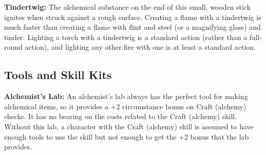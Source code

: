\textbf{Tindertwig:} The alchemical substance on the end of this small, wooden 
stick ignites when struck against a rough surface. Creating a flame with a tindertwig 
is much faster than creating a flame with flint and steel (or a magnifying glass) 
and tinder. Lighting a torch with a tindertwig is a standard action (rather than 
a full-round action), and lighting any other fire with one is at least a standard 
action.

\subsection{Tools and Skill Kits}

\textbf{Alchemist's Lab:} An alchemist's lab always has the perfect tool for making 
alchemical items, so it provides a +2 circumstance bonus on Craft (alchemy) checks. 
It has no bearing on the costs related to the Craft (alchemy) skill. Without this 
lab, a character with the Craft (alchemy) skill is assumed to have enough tools 
to use the skill but not enough to get the +2 bonus that the lab provides.

